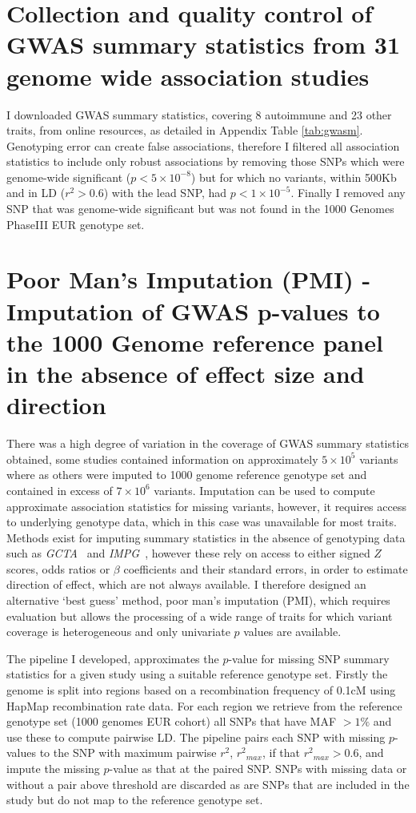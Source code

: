 \documentclass[a4paper,11pt]{report}
\begin{document}
\section{Collection and quality control of GWAS summary statistics from 31 genome wide association studies}
I downloaded GWAS summary statistics, covering 8 autoimmune and 23 other traits, from online resources, as detailed in Appendix Table \ref{tab:gwasm}. Genotyping error can create false associations,  therefore I filtered all association statistics to include only robust associations by removing those SNPs which were genome-wide significant ($p < 5 \times 10^{-8}$) but for which no variants, within 500Kb and in LD ($r^{2} > 0.6$) with the lead SNP, had $p < 1 \times 10^{-5}$. Finally I removed any SNP that was genome-wide significant but was not found in the 1000 Genomes PhaseIII EUR genotype set. 
\section{Poor Man's Imputation (PMI) - Imputation of GWAS p-values to the 1000 Genome reference panel in the absence of effect size and direction}
There was a high degree of variation in the coverage of GWAS summary statistics obtained, some studies contained information on approximately $5 \times 10^5$ variants where as others were imputed to 1000 genome reference genotype set and contained in excess of $7 \times 10^6$ variants. Imputation can be used to compute approximate association statistics for missing variants, however, it requires access to underlying genotype data, which in this case was unavailable for most traits. Methods exist for imputing summary statistics in the absence of genotyping data such as \textit{GCTA}~\citep{YangLeeGoddardEtAl2011} and \textit{IMPG}~\citep{Pasaniuc2014-im}, however these rely on access to either signed $Z$ scores, odds ratios or $\beta$ coefficients and their standard errors, in order to estimate direction of effect, which are not always available. I therefore designed an alternative `best guess' method, poor man's imputation (PMI), which requires evaluation but allows the processing of a wide range of traits for which variant coverage is heterogeneous and only univariate $p$ values are available.

The pipeline I developed, approximates the $p$-value for missing SNP summary statistics for a given study using a suitable reference genotype set. Firstly the genome is split into regions based on a recombination frequency of 0.1cM using HapMap recombination rate data. For each region we retrieve from the reference genotype set (1000 genomes EUR cohort) all SNPs that have MAF $ > 1\%$ and use these to compute pairwise LD. The pipeline pairs each SNP with missing $p$-values to the SNP with maximum pairwise $r^2$, ${r^2}_{max}$, if that ${r^2}_{max} > 0.6$, and impute the missing $p$-value as that at the paired SNP. SNPs with missing data or without a pair above threshold are discarded as are SNPs that are included in the study but do not map to the reference genotype set.
\end{document}
